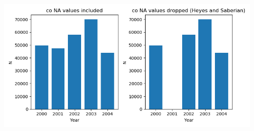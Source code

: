 \documentclass[11pt]{article}
\begin{document}
\begin{subappendices}
		\begin{center}
		 \label{tab:title} 
		{
		\includegraphics[scale=0.85]{double_plot_year_dist_with_and_whithout_co.png}	
		}
		\end{center}		
		
		
	\end{subappendices}	
	
	
	\newpage
\end{document}
